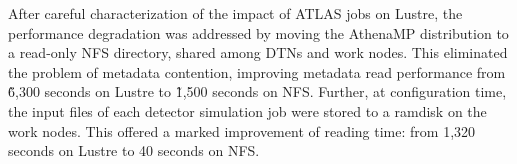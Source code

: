 %
%


After careful characterization of the impact of ATLAS jobs on Lustre, the
performance degradation was addressed by moving the AthenaMP distribution to a
read-only NFS directory, shared among DTNs and work nodes. This eliminated the
problem of metadata contention, improving metadata read performance from \~6,300
seconds on Lustre to \~1,500 seconds on NFS. Further, at configuration time, the
input files of each detector simulation job were stored to a ramdisk on the work
nodes. This offered a marked improvement of reading time: from 1,320 seconds on
Lustre to 40 seconds on NFS.

